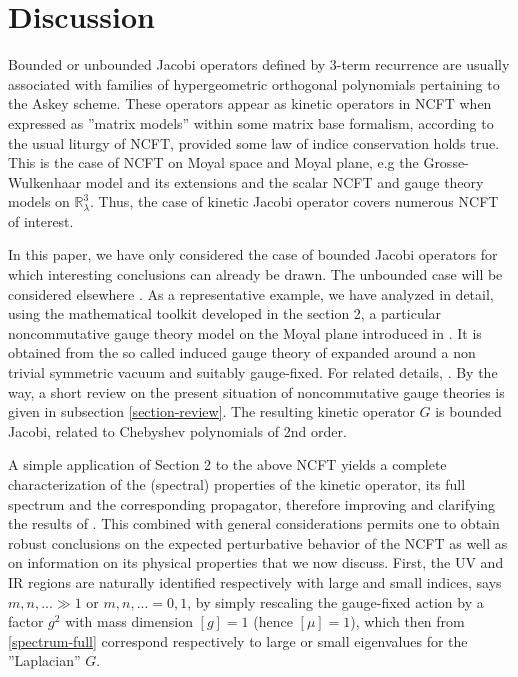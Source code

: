 \documentclass[a4paper,11pt,twoside]{article}
\numberwithin{equation}{section}
\theoremstyle{nonumberplain}
\begin{document}

\section{Discussion}\label{discuss}

Bounded or unbounded Jacobi operators defined by 3-term recurrence are usually associated with families of hypergeometric orthogonal polynomials pertaining to the Askey scheme. These operators appear as kinetic operators in NCFT when expressed as ''matrix models'' within some matrix base formalism, according to the usual liturgy of NCFT, provided some law of indice conservation holds true. This is the case of NCFT on Moyal space and Moyal plane, e.g the Grosse-Wulkenhaar model and its extensions and the scalar NCFT and gauge theory models on $\mathbb{R}^3_\lambda$. Thus, the case of kinetic Jacobi operator covers numerous NCFT of interest. \par
In this paper, we have only considered the case of bounded Jacobi operators for which interesting conclusions can already be drawn. The unbounded case will be considered elsewhere \cite{unboud-jac}. As a representative example, we have analyzed in detail, using the mathematical toolkit developed in the section 2, a particular noncommutative gauge theory model on the Moyal plane introduced in \cite{MVW13}. It is obtained from the so called induced gauge theory of \cite{GWW,GW07} expanded around a non trivial symmetric vacuum and suitably gauge-fixed. For related details, \cite{MVW13}. By the way, a short review on the present situation of noncommutative gauge theories is given in subsection \ref{section-review}. The resulting kinetic operator $G$ is bounded Jacobi, related to Chebyshev polynomials of 2nd order.\par 
A simple application of Section 2 to the above NCFT yields a complete characterization of the (spectral) properties of the kinetic operator, its full spectrum and the corresponding propagator, therefore improving and clarifying the results of \cite{MVW13}. This combined with general considerations permits one to obtain robust conclusions on the expected perturbative behavior of the NCFT as well as on information on its physical properties that we now discuss. First, the UV and IR regions are naturally identified respectively with large and small indices, says $m,n,...\gg 1$ or $m,n,... =0,1$, by simply rescaling the gauge-fixed action by a factor $g^2$ with mass dimension $[g]=1$ (hence $[\mu]=1$), which then from \eqref{spectrum-full} correspond respectively to large or small eigenvalues for the ''Laplacian'' $G$.
\end{document}
